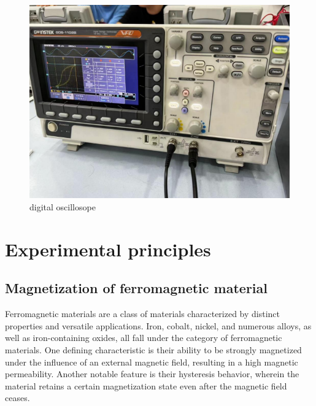 \documentclass[UTF8]{article}
\begin{document}
	\begin{figure}[H]
	    	\centering
	    	\includegraphics[clip,scale=0.9,trim={0 0 0 0}]{fig/fig2.png}
	        \caption{digital oscillosope}
	        \label{figure.1}
    \end{figure}        
    
        
	\section{Experimental principles}   
    \subsection{Magnetization of ferromagnetic material}
    Ferromagnetic materials are a class of materials characterized by distinct properties and versatile applications. Iron, cobalt, nickel, and numerous alloys, as well as iron-containing oxides, all fall under the category of ferromagnetic materials. One defining characteristic is their ability to be strongly magnetized under the influence of an external magnetic field, resulting in a high magnetic permeability. Another notable feature is their hysteresis behavior, wherein the material retains a certain magnetization state even after the magnetic field ceases.
   
\end{document}

